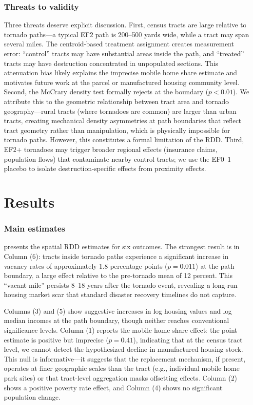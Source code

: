 \documentclass[12pt]{article}
\begin{document}
\subsubsection*{Threats to validity} Three threats deserve explicit discussion. First, census tracts are large relative to tornado paths---a typical EF2 path is 200--500 yards wide, while a tract may span several miles. The centroid-based treatment assignment creates measurement error: ``control'' tracts may have substantial areas inside the path, and ``treated'' tracts may have destruction concentrated in unpopulated sections. This attenuation bias likely explains the imprecise mobile home share estimate and motivates future work at the parcel or manufactured housing community level. Second, the McCrary density test formally rejects at the boundary ($p < 0.01$). We attribute this to the geometric relationship between tract area and tornado geography---rural tracts (where tornadoes are common) are larger than urban tracts, creating mechanical density asymmetries at path boundaries that reflect tract geometry rather than manipulation, which is physically impossible for tornado paths. However, this constitutes a formal limitation of the RDD. Third, EF2+ tornadoes may trigger broader regional effects (insurance claims, population flows) that contaminate nearby control tracts; we use the EF0--1 placebo to isolate destruction-specific effects from proximity effects.

\section{Results}
\label{sec:results}

\subsubsection*{Main estimates}  presents the spatial RDD estimates for six outcomes. The strongest result is in Column (6): tracts inside tornado paths experience a significant increase in vacancy rates of approximately 1.8 percentage points ($p = 0.011$) at the path boundary, a large effect relative to the pre-tornado mean of 12 percent. This ``vacant mile'' persists 8--18 years after the tornado event, revealing a long-run housing market scar that standard disaster recovery timelines do not capture.

Columns (3) and (5) show suggestive increases in log housing values and log median incomes at the path boundary, though neither reaches conventional significance levels. Column (1) reports the mobile home share effect: the point estimate is positive but imprecise ($p = 0.41$), indicating that at the census tract level, we cannot detect the hypothesized decline in manufactured housing stock. This null is informative---it suggests that the replacement mechanism, if present, operates at finer geographic scales than the tract (e.g., individual mobile home park sites) or that tract-level aggregation masks offsetting effects. Column (2) shows a positive poverty rate effect, and Column (4) shows no significant population change.
\end{document}
